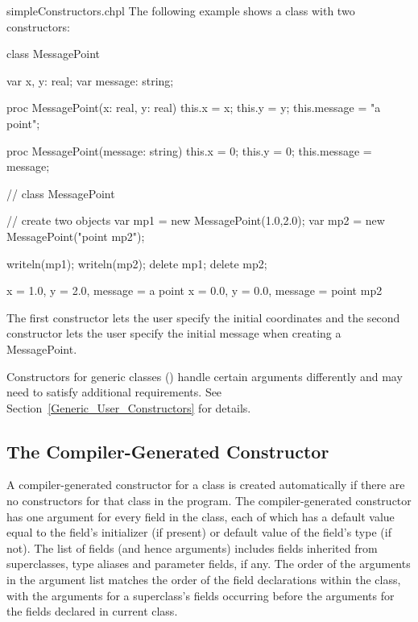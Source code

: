 \begin{chapelexample}{simpleConstructors.chpl}
The following example shows a class with two constructors:
\begin{chapel}
class MessagePoint {
  var x, y: real;
  var message: string;

  proc MessagePoint(x: real, y: real) {
    this.x = x;
    this.y = y;
    this.message = "a point";
  }

  proc MessagePoint(message: string) {
    this.x = 0;
    this.y = 0;
    this.message = message;
  }
}  // class MessagePoint

// create two objects
var mp1 = new MessagePoint(1.0,2.0);
var mp2 = new MessagePoint("point mp2");
\end{chapel}
\begin{chapelpost}
writeln(mp1);
writeln(mp2);
delete mp1;
delete mp2;
\end{chapelpost}
\begin{chapeloutput}
{x = 1.0, y = 2.0, message = a point}
{x = 0.0, y = 0.0, message = point mp2}
\end{chapeloutput}
The first constructor lets the user specify the initial coordinates
and the second constructor lets the user specify the initial message
when creating a MessagePoint.
\end{chapelexample}

Constructors for generic classes () handle certain
arguments differently and may need to satisfy additional
requirements. See Section~\ref{Generic_User_Constructors} for details.

\subsection{The Compiler-Generated Constructor}
\label{The_Compiler_Generated_Constructor}

A compiler-generated constructor for a class is created automatically
if there are no constructors for that class in the program.
The compiler-generated constructor has one argument for every field in the class,
each of which has a default value equal to the field's initializer (if present) or default value of the field's type (if not).
The list of fields (and hence arguments) includes fields inherited from superclasses, type aliases
and parameter fields, if any.
The order of the arguments in the argument list matches the order of the field declarations
within the class, with the arguments for a superclass's fields occurring
before the arguments for the fields declared in current class.

